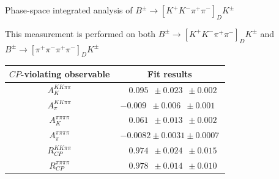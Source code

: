 \documentclass{beamer}
\begin{document}
\begin{frame}{Phase-space integrated analysis of $B^\pm\to[K^+K^-\pi^+\pi^-]_DK^\pm$}
  \begin{center}
    {\large This measurement is performed on both $B^\pm\to[K^+K^-\pi^+\pi^-]_DK^\pm$ and $B^\pm\to[\pi^+\pi^-\pi^+\pi^-]_DK^\pm$}
  \end{center}
  \centering
  \def\arraystretch{1.2}%
  \begin{tabular}{cc}
    \hline
    $C\!P$-violating observable & Fit results \\
    \hline
    $A_K^{KK\pi\pi}$            & $\phantom{-}0.095\phantom{0} \pm 0.023\phantom{0} \pm 0.002\phantom{0}$ \\
    $A_\pi^{KK\pi\pi}$          & $-0.009\phantom{0} \pm 0.006\phantom{0} \pm 0.001\phantom{0}$ \\
    $A_K^{\pi\pi\pi\pi}$        & $\phantom{-}0.061\phantom{0} \pm 0.013\phantom{0} \pm 0.002\phantom{0}$ \\
    $A_\pi^{\pi\pi\pi\pi}$      & $-0.0082 \pm 0.0031 \pm 0.0007$ \\
    $R_{C\!P}^{KK\pi\pi}$       & $\phantom{-}0.974\phantom{0} \pm 0.024\phantom{0} \pm 0.015\phantom{0}$ \\
    $R_{C\!P}^{\pi\pi\pi\pi}$   & $\phantom{-}0.978\phantom{0} \pm 0.014\phantom{0} \pm 0.010\phantom{0}$ \\
    \hline
  \end{tabular}
\end{frame}
\end{document}
